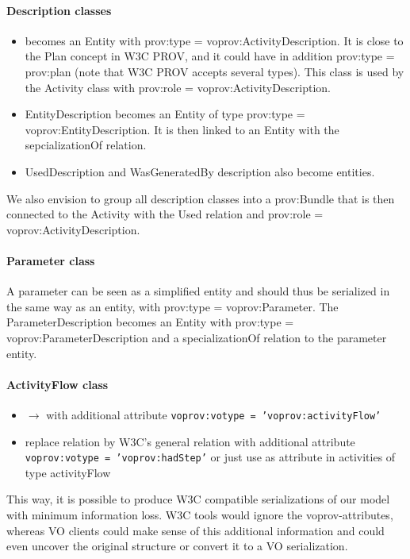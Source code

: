 \paragraph{Description classes}
\begin{itemize}
\item {} becomes an Entity with prov:type = voprov:ActivityDescription. It is close to the Plan concept in W3C PROV, and it could have in addition prov:type = prov:plan (note that W3C PROV accepts several types). This class is used by the Activity class with prov:role = voprov:ActivityDescription.
\item EntityDescription becomes an Entity of type prov:type = voprov:EntityDescription. It is then linked to an Entity with the sepcializationOf relation.
\item UsedDescription and WasGeneratedBy description also become entities.
\end{itemize}
We also envision to group all description classes into a prov:Bundle that is then connected to the Activity with the Used relation and prov:role = voprov:ActivityDescription.

\paragraph{Parameter class}
A parameter can be seen as a simplified entity and should thus be serialized in the same way as an entity, with prov:type = voprov:Parameter. The ParameterDescription becomes an Entity with prov:type = voprov:ParameterDescription and a specializationOf relation to the parameter entity.

\paragraph{ActivityFlow class}
\begin{itemize}
	\item {} $\rightarrow$  with additional attribute \texttt{voprov:votype = 'voprov:activityFlow'}
	\item replace  relation by W3C's general  relation with additional attribute \texttt{voprov:votype = 'voprov:hadStep'} or just use  as attribute in activities of type activityFlow
\end{itemize}

This way, it is possible to produce W3C compatible serializations of our model with minimum information loss. W3C tools would ignore the voprov-attributes, whereas VO clients could make sense of this additional information and could even uncover the original structure or convert it to a VO serialization.
